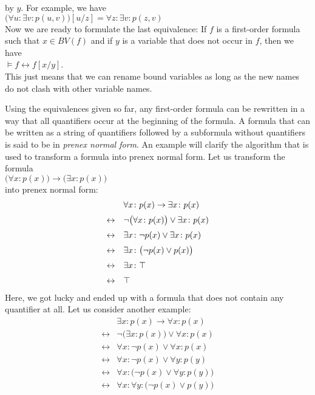 by  $y$.  For example, we have \\[0.2cm]
\hspace*{1.3cm} $\bigl(\forall u : \exists v : p(u,v)\bigr)[u/z] = \forall z : \exists v : p(z,v)$
\\[0.2cm]
Now we are ready to formulate the last equivalence: If $f$ is a first-order formula such that
 $x \in BV(f)$ and if  $y$ is a variable that does not occur in $f$, then we have 
\\[0.2cm]
\hspace*{1.3cm} $\models f \leftrightarrow f[x/y]$.
\\[0.2cm]
This just means that we can rename bound variables as long as the new names do not clash
with other variable names.

Using the equivalences given so far,  any first-order formula can be rewritten in a way
that all quantifiers occur at the beginning of the formula.  A formula that can be written
as a string of quantifiers followed by a subformula without quantifiers is said to be in
\emph{prenex normal form}.  An example will clarify the algorithm that is used to
transform a formula into prenex normal form.  Let us transform the formula
 \\[0.2cm]
\hspace*{1.3cm} $\big(\forall x\colon p(x)\big) \rightarrow \big(\exists x\colon p(x)\big)$ \\[0.2cm]
into prenex normal form: 
$$ 
\begin{array}{ll}
                 & \forall x\colon p(x) \rightarrow \exists x\colon p(x)            \\[0.2cm]
 \leftrightarrow & \neg \big(\forall x\colon p(x)\big) \vee \exists x\colon p(x)    \\[0.2cm]
 \leftrightarrow & \exists x\colon \neg p(x) \vee \exists x\colon p(x)              \\[0.2cm]
 \leftrightarrow & \exists x\colon \bigl(\neg p(x) \vee p(x)\bigr)                  \\[0.2cm]
 \leftrightarrow & \exists x\colon \top                                           \\[0.2cm]
 \leftrightarrow & \top                                                  
\end{array}
$$
Here, we got lucky and ended up with a formula that does not contain any quantifier at all.
Let us consider another example:
$$ 
\begin{array}{ll}
                 & \exists x\colon p(x) \rightarrow \forall x\colon p(x)            \\[0.2cm]
 \leftrightarrow & \neg \big(\exists x\colon p(x)\big) \vee \forall x\colon p(x)    \\[0.2cm]
 \leftrightarrow & \forall x\colon \neg p(x) \vee \forall x\colon p(x)              \\[0.2cm]
 \leftrightarrow & \forall x\colon \neg p(x) \vee \forall y\colon p(y)              \\[0.2cm]
 \leftrightarrow & \forall x\colon \bigl(\neg p(x) \vee \forall y\colon p(y)\bigr)  \\[0.2cm]
 \leftrightarrow & \forall x\colon \forall y\colon \bigl(\neg p(x) \vee p(y)\bigr)  \\[0.2cm]
\end{array}
$$
